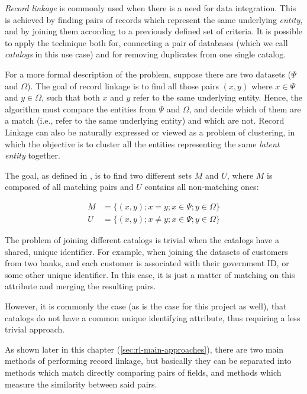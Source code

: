 \documentclass[epsfig,a4paper,11pt,titlepage,twoside,openany]{book}
\begin{document}
\textit{Record linkage} is commonly used when there is a need for data integration. This is achieved by finding pairs of records which represent the same underlying \textit{entity}, and by joining them according to a previously defined set of criteria. It is possible to apply the technique both for, connecting a pair of databases (which we call \textit{catalogs} in this use case) and for removing duplicates from one single catalog.

  

For a more formal description of the problem, suppose there are two datasets ($\Psi$ and $\Omega$). The goal of record linkage is to find all those pairs $(x, y)$ where $x \in \Psi$ and $y \in \Omega$, such that both $x$ and $y$ refer to the same underlying entity. Hence, the algorithm must compare the entities from $\Psi$ and $\Omega$, and decide which of them are a match (i.e., refer to the same underlying entity) and which are not. 
Record Linkage can also be naturally expressed or viewed as a problem of clustering, in which the objective is to cluster all the entities representing the same \textit{latent entity} together.

The goal, as defined in \cite{fellegi69_theor_recor_linkag}, is to find two different sets $M$ and $U$, where $M$ is composed of all matching pairs and $U$ contains all non-matching ones:

\begin{align*}
  M &= \{(x, y); x = y; x \in \Psi; y \in \Omega\} \\
  U &= \{(x, y); x \neq y; x \in \Psi; y \in \Omega\}
\end{align*}

The problem of joining different catalogs is trivial when the catalogs have a
shared, unique identifier. For example, when joining the datasets of
customers from two banks, and each customer is associated with their government
ID, or some other unique identifier. In this case, it is just a matter of
matching on this attribute and merging the resulting pairs.

However, it is commonly the case (as is the case for this project as well), that
catalogs do not have a common unique identifying attribute, thus requiring a less trivial approach.

As shown later in this chapter (\autoref{sec:rl-main-approaches}), there are two main methods of performing record linkage, but basically they can be separated into methods which match directly comparing pairs of fields, and methods which measure the similarity between said pairs.
\end{document}
